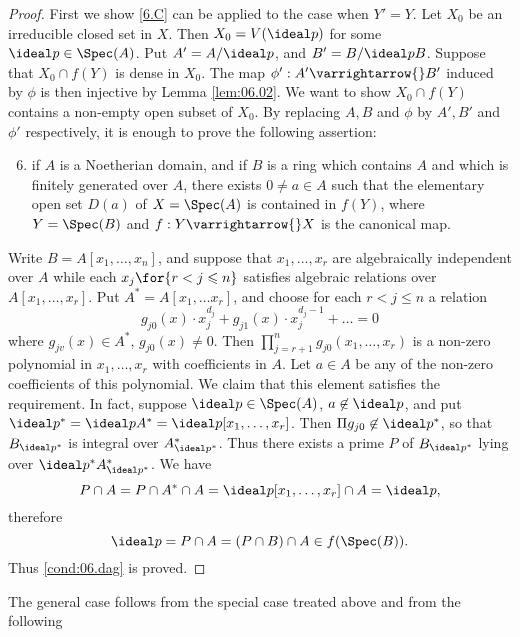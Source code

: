 \documentclass[../main]{subfiles}
\begin{document}
\begin{proof}
First we show \ref{6.C} can be applied to the case when $Y' = Y$. Let $X_0$ be an irreducible closed set in $X$. Then $X_0 = V(\ideal p)$ for some $\ideal p \in \Spec(A)$. Put $A' = A / \ideal p$, and $B' = B / \ideal p B$. Suppose that $X_0 \cap f(Y)$ is dense in $X_0$. The map $\phi' : A' \varrightarrow{} B'$ induced by $\phi$ is then injective by Lemma \ref{lem:06.02}. We want to show $X_0 \cap f(Y)$ contains a non-empty open subset of $X_0$. By replacing $A,B$ and $\phi$ by $A', B'$ and $\phi'$ respectively, it is enough to prove the following assertion:

\begin{enumerate}[label=(\arabic*.$\dagger$)]\setcounter{enumi}{5}
    \item\label{cond:06.dag} if $A$ is a Noetherian domain, and if $B$ is a ring which contains $A$ and which is finitely generated over $A$, there exists $0 \ne a \in A$ such that the elementary open set $D(a)$ of $X=\Spec(A)$ is contained in $f(Y)$, where $Y=\Spec(B)$ and $f: Y \varrightarrow{} X$ is the canonical map.
\end{enumerate}

Write $B=A[x_1, \ldots, x_n]$, and suppose that $x_1,\ldots,x_r$ are algebraically independent over $A$ while each $x_j\for{r<j\leqslant n}$ satisfies algebraic relations over $A[x_1, \ldots, x_r]$. Put $A^* = A[x_1, \ldots x_r]$, and choose for each $r < j \le n$ a relation
\[
g_{j0}(x) \cdot x_j ^{d_j} + g_{j1}(x) \cdot x_j ^{d_j-1} + \dots = 0
\]
where $g_{jv} (x) \in A^*$, $g_{j0}(x) \ne 0$. Then $\prod_{j=r+1} ^n g_{j0} (x_1, \dots, x_r)$ is a non-zero polynomial in $x_1, \dots, x_r$ with coefficients in $A$. Let $a \in A$ be any of the non-zero coefficients of this polynomial. We claim that this element satisfies the requirement. In fact, suppose $\ideal p \in \Spec(A)$, $a \not\in \ideal p$, and put $\ideal p^* =\ideal p A^* = \ideal p[x_1, \dots, x_r]$. Then $\Pi g_{j0} \not\in \ideal p^*$, so that $B_{\ideal p^*}$ is integral over $A^* _{\ideal p^*}$. Thus there exists a prime $P$ of $B_{\ideal p^*}$ lying over $\ideal p^* A^* _{\ideal p^*}$. We have
\[
P \cap A = P \cap A^* \cap A = \ideal p[x_1,\dots,x_r]\cap A = \ideal p,
\]
therefore 
\[
\ideal p = P \cap A = (P \cap B) \cap A \in f(\Spec(B)).
\]
Thus \ref{cond:06.dag} is proved.
\end{proof}

The general case follows from the special case treated above and from the following
\end{document}
